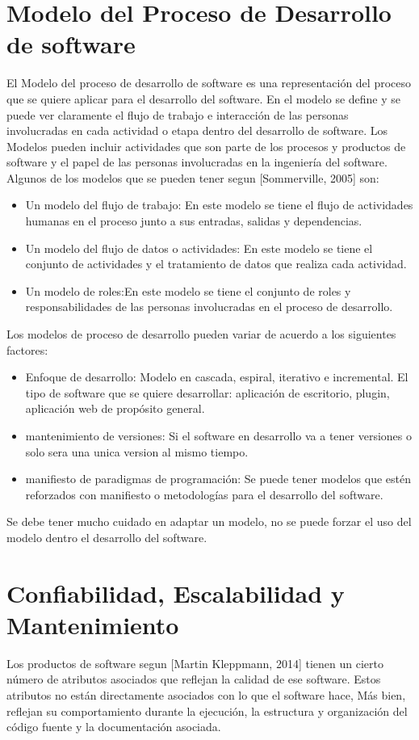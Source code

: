 \section{Modelo del Proceso de Desarrollo de software}
\noindent El Modelo del proceso de desarrollo de software es una representación del proceso que se quiere aplicar para el desarrollo del software. En el modelo se define y se puede ver claramente el flujo de trabajo e interacción de las personas involucradas en cada actividad o etapa dentro del desarrollo de software.
\noindent Los Modelos pueden incluir actividades que son parte de los procesos y productos de software y el papel de las personas involucradas en la ingeniería del software. Algunos de los modelos que se pueden tener segun [Sommerville, 2005] son:
\begin{itemize}
\item Un modelo del flujo de trabajo: En este modelo se tiene el flujo de actividades humanas en el proceso junto a sus entradas, salidas y dependencias.
\item Un modelo del flujo de datos o actividades: En este modelo se tiene el conjunto de actividades y el tratamiento de datos que realiza cada actividad.
\item Un modelo de roles:En este modelo se tiene el conjunto de roles y responsabilidades de las personas involucradas en el proceso de desarrollo.
\end{itemize}

\noindent Los modelos de proceso de desarrollo pueden variar de acuerdo a los siguientes factores:
\begin{itemize}
\item Enfoque de desarrollo: Modelo en cascada, espiral, iterativo e incremental.
El tipo de software que se quiere desarrollar: aplicación de escritorio, plugin, aplicación web de propósito general.
\item mantenimiento de versiones: Si el software en desarrollo va a tener versiones o solo sera una unica version al mismo tiempo.
\item manifiesto de paradigmas de programación: Se puede tener modelos que estén reforzados con manifiesto o metodologías para el desarrollo del software.
\end{itemize}
\noindent Se debe tener mucho cuidado en adaptar un modelo, no se puede forzar el uso del modelo dentro el desarrollo del software.   

\section{Confiabilidad, Escalabilidad y Mantenimiento}
\noindent Los productos de software segun [Martin Kleppmann, 2014] tienen un cierto número de atributos asociados que reflejan la calidad de ese software. Estos atributos no están directamente asociados con lo que el software hace, Más bien, reflejan su comportamiento durante la ejecución, la estructura y organización del código fuente y la documentación asociada.

